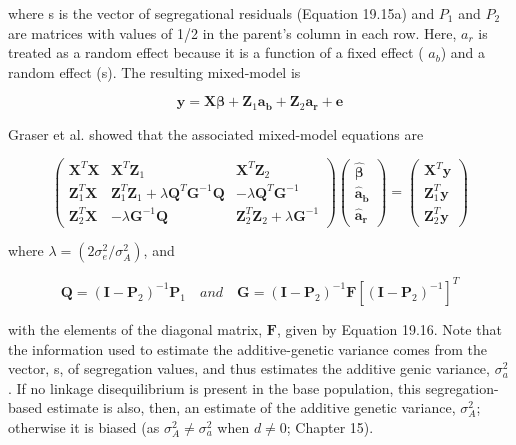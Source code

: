 \documentclass{article}
\begin{document}
where s is the vector of segregational residuals (Equation 19.15a) and  $ P_1 $ and  $ P_2 $ are matrices with values of 1/2 in the parent's column in each row. Here,  $ a_r $ is treated as a random effect because it is a function of a fixed effect ( $ a_b $) and a random effect (s). The resulting mixed-model is

\begin{equation}
\mathbf{y}=\mathbf{X}\boldsymbol{\beta}+\mathbf{Z}_{1}\mathbf{a}_{\mathbf{b}}+\mathbf{Z}_{2}\mathbf{a}_{\mathbf{r}}+\mathbf{e}
\tag{19.23}
\label{eq:19_23}
\end{equation}

Graser et al. showed that the associated mixed-model equations are

\begin{equation}
\begin{pmatrix}\mathbf{X}^{T}\mathbf{X}&\mathbf{X}^{T}\mathbf{Z}_{1}&\mathbf{X}^{T}\mathbf{Z}_{2}\\\mathbf{Z}_{1}^{T}\mathbf{X}&\mathbf{Z}_{1}^{T}\mathbf{Z}_{1}+\lambda\mathbf{Q}^{T}\mathbf{G}^{-1}\mathbf{Q}&-\lambda\mathbf{Q}^{T}\mathbf{G}^{-1}\\\mathbf{Z}_{2}^{T}\mathbf{X}&-\lambda\mathbf{G}^{-1}\mathbf{Q}&\mathbf{Z}_{2}^{T}\mathbf{Z}_{2}+\lambda\mathbf{G}^{-1}\end{pmatrix}\begin{pmatrix}\widehat{\boldsymbol{\beta}}\\\widehat{\mathbf{a}}_{\mathbf{b}}\\\widehat{\mathbf{a}}_{\mathbf{r}}\end{pmatrix}=\begin{pmatrix}\mathbf{X}^{T}\mathbf{y}\\\mathbf{Z}_{1}^{T}\mathbf{y}\\\mathbf{Z}_{2}^{T}\mathbf{y}\end{pmatrix}
\tag{19.24a}
\label{eq:19_24a}
\end{equation}

where  $ \lambda = (2\sigma_{e}^{2}/\sigma_{A}^{2}) $, and

\begin{equation}
\mathbf{Q}=(\mathbf{I}-\mathbf{P}_{2})^{-1}\mathbf{P}_{1}\quad and\quad\mathbf{G}=(\mathbf{I}-\mathbf{P}_{2})^{-1}\mathbf{F}\left[(\mathbf{I}-\mathbf{P}_{2})^{-1}\right]^{T}
\tag{19.24b}
\label{eq:19_24b}
\end{equation}

with the elements of the diagonal matrix,  $ \mathbf{F} $, given by Equation 19.16. Note that the information used to estimate the additive-genetic variance comes from the vector, s, of segregation values, and thus estimates the additive genic variance,  $ \sigma_a^2 $. If no linkage disequilibrium is present in the base population, this segregation-based estimate is also, then, an estimate of the additive genetic variance,  $ \sigma_A^2 $; otherwise it is biased (as  $ \sigma_A^2 \neq \sigma_a^2 $ when  $ d \neq 0 $; Chapter 15).
\end{document}
